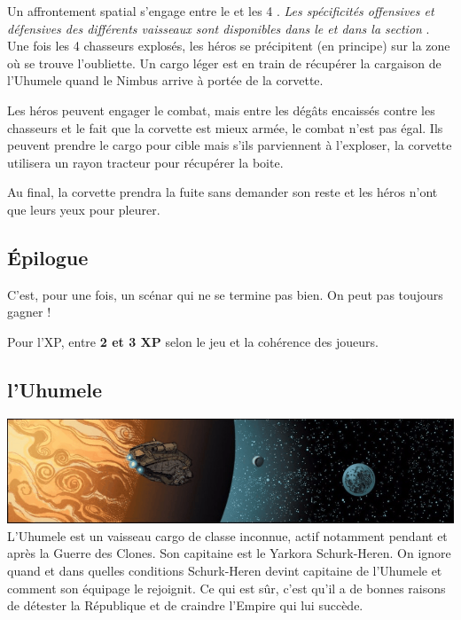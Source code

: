 Un affrontement spatial s’engage entre le  et les 4 . \textit{Les spécificités offensives et défensives des différents vaisseaux sont disponibles dans le  et dans la section }.\\

Une fois les 4 chasseurs explosés, les héros se précipitent (en principe) sur la zone où se trouve l’oubliette. Un cargo léger est en train de récupérer la cargaison de l’Uhumele quand le Nimbus arrive à portée de la corvette.

Les héros peuvent engager le combat, mais entre les dégâts encaissés contre les chasseurs et le fait que la corvette est mieux armée, le combat n’est pas égal. Ils peuvent prendre le cargo pour cible mais s’ils parviennent à l’exploser, la corvette utilisera un rayon tracteur pour récupérer la boite.

Au final, la corvette prendra la fuite sans demander son reste et les héros n’ont que leurs yeux pour pleurer.

\subsection{\'Epilogue}
C’est, pour une fois, un scénar qui ne se termine pas bien. On peut pas toujours gagner !

Pour l’XP, entre \textbf{2 et 3 XP} selon le jeu et la cohérence des joueurs.

\clearpage
\subsection{l’Uhumele}\label{sec:uhumele}
\noindent\includegraphics[width=\textwidth]{_img/uhumele-pano.png}
\\

L’Uhumele est un vaisseau cargo de classe inconnue, actif notamment pendant et après la Guerre des Clones. Son capitaine est le Yarkora Schurk-Heren. On ignore quand et dans quelles conditions Schurk-Heren devint capitaine de l’Uhumele et comment son équipage le rejoignit. Ce qui est sûr, c’est qu’il a de bonnes raisons de détester la République et de craindre l’Empire qui lui succède.

